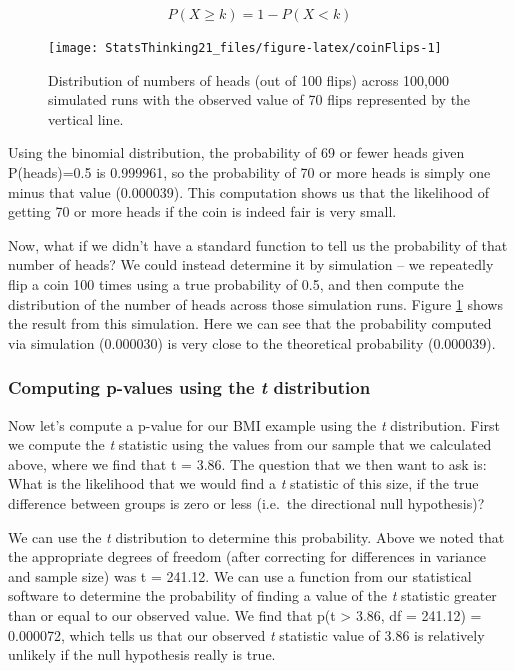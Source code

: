 \documentclass[
  12pt,
]{book}
\begin{document}
\[
P(X \ge k) = 1 - P(X < k)
\]

\begin{figure}
\texttt{[image: StatsThinking21\_files/figure-latex/coinFlips-1]} \caption{Distribution of numbers of heads (out of 100 flips) across 100,000 simulated runs with the observed value of 70 flips represented by the vertical line.}\label{fig:coinFlips}
\end{figure}

Using the binomial distribution, the probability of 69 or fewer heads given P(heads)=0.5 is 0.999961, so the probability of 70 or more heads is simply one minus that value (0.000039).
This computation shows us that the likelihood of getting 70 or more heads if the coin is indeed fair is very small.

Now, what if we didn't have a standard function to tell us the probability of that number of heads? We could instead determine it by simulation -- we repeatedly flip a coin 100 times using a true probability of 0.5, and then compute the distribution of the number of heads across those simulation runs. Figure \ref{fig:coinFlips} shows the result from this simulation. Here we can see that the probability computed via simulation (0.000030) is very close to the theoretical probability (0.000039).

\hypertarget{pvalues-tdist}{%
\subsubsection{\texorpdfstring{Computing p-values using the \emph{t} distribution}{Computing p-values using the t distribution}}\label{pvalues-tdist}}

Now let's compute a p-value for our BMI example using the \emph{t} distribution. First we compute the \emph{t} statistic using the values from our sample that we calculated above, where we find that t = 3.86. The question that we then want to ask is: What is the likelihood that we would find a \emph{t} statistic of this size, if the true difference between groups is zero or less (i.e.~the directional null hypothesis)?

We can use the \emph{t} distribution to determine this probability. Above we noted that the appropriate degrees of freedom (after correcting for differences in variance and sample size) was t = 241.12. We can use a function from our statistical software to determine the probability of finding a value of the \emph{t} statistic greater than or equal to our observed value. We find that p(t \textgreater{} 3.86, df = 241.12) = 0.000072, which tells us that our observed \emph{t} statistic value of 3.86 is relatively unlikely if the null hypothesis really is true.
\end{document}

